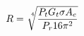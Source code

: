 \documentclass[preview]{standalone}
\begin{document}
\begin{align*}
R = \sqrt[\leftroot{-3}\uproot{3}4]{\frac{P_t G_t \sigma A_e}{P_r 16 \pi^2}}
\end{align*}
\end{document}
